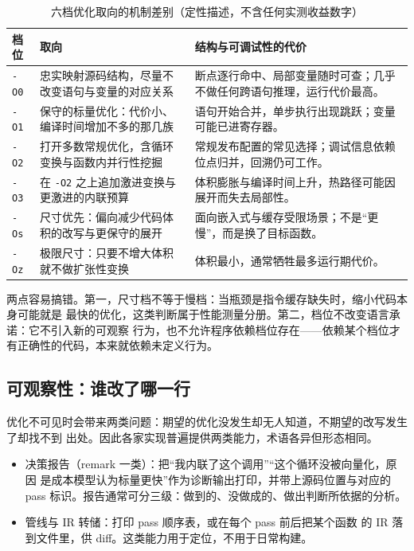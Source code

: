 \documentclass[12pt,a4paper,fontset=fandol]{ctexbook}
\newcommand{\Sw}[1]{\texttt{#1}}
\newcommand{\Mx}[1]{\textsf{#1}}
\begin{document}
\begin{table}[H]
\centering
\begin{tabularx}{0.86\textwidth}{@{}>{\raggedright\arraybackslash}p{} >{\raggedright\arraybackslash}p{} X@{}}
\toprule
档位 & 取向 & 结构与可调试性的代价 \\
\midrule
\Sw{-O0} & 忠实映射源码结构，尽量不改变语句与变量的对应关系 &
  断点逐行命中、局部变量随时可查；几乎不做任何跨语句推理，运行代价最高。 \\
\Sw{-O1} & 保守的标量优化：代价小、编译时间增加不多的那几族 &
  语句开始合并，单步执行出现跳跃；变量可能已进寄存器。 \\
\Sw{-O2} & 打开多数常规优化，含循环变换与函数内并行性挖掘 &
  常规发布配置的常见选择；调试信息依赖位点归并，回溯仍可工作。 \\
\Sw{-O3} & 在 \Sw{-O2} 之上追加激进变换与更激进的内联预算 &
  体积膨胀与编译时间上升，热路径可能因展开而失去局部性。 \\
\Sw{-Os} & 尺寸优先：偏向减少代码体积的改写与更保守的展开 &
  面向嵌入式与缓存受限场景；不是“更慢”，而是换了目标函数。 \\
\Sw{-Oz} & 极限尺寸：只要不增大体积就不做扩张性变换 &
  体积最小，通常牺牲最多运行期代价。 \\
\bottomrule
\end{tabularx}
\caption{六档优化取向的机制差别（定性描述，不含任何实测收益数字）}\label{tab:cl05-levels}
\end{table}

两点容易搞错。第一，尺寸档不等于慢档：当瓶颈是指令缓存缺失时，缩小代码本身可能就是
最快的优化，这类判断属于性能测量分册。第二，档位不改变语言承诺：它不引入新的可观察
行为，也不允许程序依赖档位存在——依赖某个档位才有正确性的代码，本来就依赖未定义行为。

\subsection{可观察性：谁改了哪一行}\label{sec:cl05-observable}

优化不可见时会带来两类问题：期望的优化没发生却无人知道，不期望的改写发生了却找不到
出处。因此各家实现普遍提供两类能力，术语各异但形态相同。

\begin{itemize}
  \item 决策报告（remark 一类）：把“我内联了这个调用”“这个循环没被向量化，原因
        是成本模型认为标量更快”作为诊断输出打印，并带上源码位置与对应的 \Mx{pass}
        标识。报告通常可分三级：做到的、没做成的、做出判断所依据的分析。
  \item 管线与 \Mx{IR} 转储：打印 \Mx{pass} 顺序表，或在每个 \Mx{pass} 前后把某个函数
        的 \Mx{IR} 落到文件里，供 diff。这类能力用于定位，不用于日常构建。
\end{itemize}
\end{document}
